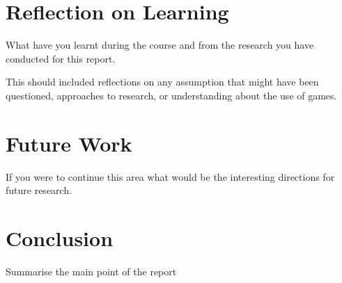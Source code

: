 \documentclass{article}
\begin{document}
\section{Reflection on Learning}

What have you learnt during the course and from the research you have conducted for this report.

This should included reflections on any assumption that might have been questioned, approaches to research, or understanding about the use of games.


\section{Future Work}

If you were to continue this area what would be the interesting directions for future research. 

\section{Conclusion}
Summarise the main point of the report



\end{document}
